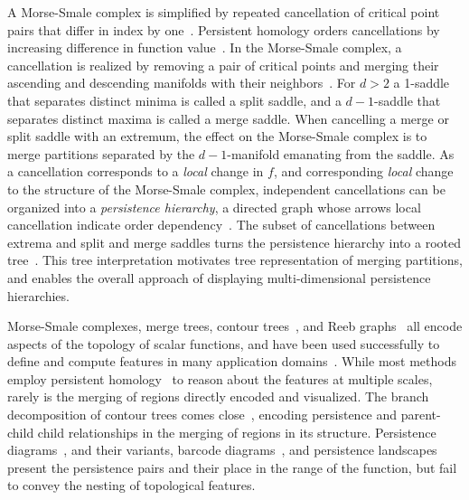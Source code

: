 A Morse-Smale complex is simplified by repeated cancellation of critical point pairs that differ in index by one~\cite{edelsbrunner03}. Persistent homology orders cancellations by increasing difference in function value~\cite{edelsbrunner02}. In the Morse-Smale complex, a cancellation is realized by removing a pair of critical points and merging their ascending and descending manifolds with their neighbors~\cite{Gyulassy06tvcg2, Gyulassy2012}. For $d>2$ a 1-saddle that separates distinct minima is called a split saddle, and a $d-1$-saddle that separates distinct maxima is called a merge saddle. When cancelling a merge or split saddle with an extremum, the effect on the Morse-Smale complex is to merge partitions separated by the $d-1$-manifold emanating from the saddle. As a cancellation corresponds to a \textit{local} change in $f$, and corresponding \textit{local} change to the structure of the Morse-Smale complex, independent cancellations can be organized into a \textit{persistence hierarchy}, a directed graph whose arrows local cancellation indicate order dependency~\cite{bremer04}. The subset of cancellations between extrema and split and merge saddles turns the persistence hierarchy into a rooted tree~\cite{Tierny2012}. This tree interpretation motivates tree representation of merging partitions, and enables the overall approach of displaying multi-dimensional persistence hierarchies.  

Morse-Smale complexes, merge trees, contour trees~\cite{carr03}, and Reeb graphs~\cite{pascucci07} all encode aspects of the topology of scalar functions, and have been used successfully to define and compute features in many application domains~\cite{Bremer09tvcg, TopoMS}. While most methods employ persistent homology~\cite{edelsbrunner02} to reason about the features at multiple scales, rarely is the merging of regions directly encoded and visualized. The branch decomposition of contour trees comes close~\cite{Pascucci2009}, encoding persistence and parent-child child relationships in the merging of regions in its structure.   Persistence diagrams~\cite{edelsbrunner02,  edelsbrunner03, Cohen-Steiner07}, and their variants, barcode diagrams~\cite{Ghrist2008}, and persistence landscapes~\cite{bubenik2012statistical} present the persistence pairs and their place in the range of the function, but fail to convey the nesting of topological features.  

